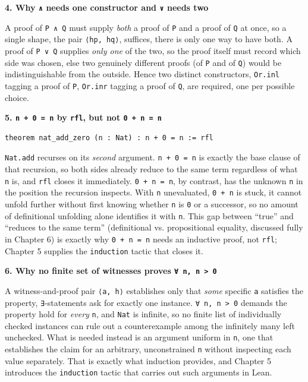 \textbf{4. Why \texttt{∧} needs one constructor and \texttt{∨} needs two}

A proof of \texttt{P ∧ Q} must supply \emph{both} a proof of \texttt{P} and a proof of \texttt{Q} at once, so a single shape, the pair \texttt{⟨hp, hq⟩}, suffices, there is only one way to have both. A proof of \texttt{P ∨ Q} supplies \emph{only one} of the two, so the proof itself must record which side was chosen, else two genuinely different proofs (of \texttt{P} and of \texttt{Q}) would be indistinguishable from the outside. Hence two distinct constructors, \texttt{Or.inl} tagging a proof of \texttt{P}, \texttt{Or.inr} tagging a proof of \texttt{Q}, are required, one per possible choice.

\textbf{5. \texttt{n + 0 = n} by \texttt{rfl}, but not \texttt{0 + n = n}}

\begin{lstlisting}
theorem nat_add_zero (n : Nat) : n + 0 = n := rfl
\end{lstlisting}

\texttt{Nat.add} recurses on its \emph{second} argument. \texttt{n + 0 = n} is exactly the base clause of that recursion, so both sides already reduce to the same term regardless of what \texttt{n} is, and \texttt{rfl} closes it immediately. \texttt{0 + n = n}, by contrast, has the unknown \texttt{n} in the position the recursion inspects. With \texttt{n} unevaluated, \texttt{0 + n} is stuck, it cannot unfold further without first knowing whether \texttt{n} is \texttt{0} or a successor, so no amount of definitional unfolding alone identifies it with \texttt{n}. This gap between ``true'' and ``reduces to the same term'' (definitional vs. propositional equality, discussed fully in Chapter 6) is exactly why \texttt{0 + n = n} needs an inductive proof, not \texttt{rfl}; Chapter 5 supplies the \texttt{induction} tactic that closes it.

\textbf{6. Why no finite set of witnesses proves \texttt{∀ n, n > 0}}

A witness-and-proof pair \texttt{⟨a, h⟩} establishes only that \emph{some} specific \texttt{a} satisfies the property, \texttt{∃}-statements ask for exactly one instance. \texttt{∀ n, n > 0} demands the property hold for \emph{every} \texttt{n}, and \texttt{Nat} is infinite, so no finite list of individually checked instances can rule out a counterexample among the infinitely many left unchecked. What is needed instead is an argument uniform in \texttt{n}, one that establishes the claim for an arbitrary, unconstrained \texttt{n} without inspecting each value separately. That is exactly what induction provides, and Chapter 5 introduces the \texttt{induction} tactic that carries out such arguments in Lean.
